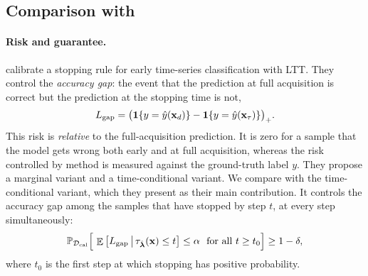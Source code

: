 \providecommand{\todo}[1]{\textcolor{red}{[TODO: #1]}}

\subsection{Comparison with \citet{ringel2024early}}
\label{app:ringel}

\paragraph{Risk and guarantee.}
\citet{ringel2024early} calibrate a stopping rule for early time-series classification with LTT. They control the \emph{accuracy gap}: the event that the prediction at full acquisition is correct but the prediction at the stopping time is not,
\begin{align}
    L_{\text{gap}} = \big(\mathbf{1}\{y = \hat{y}(\mathbf{x}_d)\} - \mathbf{1}\{y = \hat{y}(\mathbf{x}_{\tau})\}\big)_+ .
\end{align}
This risk is \emph{relative} to the full-acquisition prediction. It is zero for a sample that the model gets wrong both early and at full acquisition, whereas the risk controlled by \gls{method} is measured against the ground-truth label $y$. They propose a marginal variant and a time-conditional variant. We compare with the time-conditional variant, which they present as their main contribution. It controls the accuracy gap among the samples that have stopped by step $t$, at every step simultaneously:
\begin{align}
    \bbP_{\cD_{\text{cal}}}\Big[\, \E\big[L_{\text{gap}} \,\big|\, \tau_{\hat{\boldsymbol\lambda}}(\mbx) \le t\big] \le \alpha \ \ \text{for all } t \ge t_0 \Big] \ge 1 - \delta ,
\end{align}
where $t_0$ is the first step at which stopping has positive probability.

